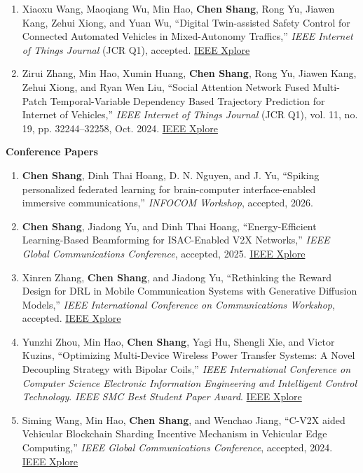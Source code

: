 \documentclass[10pt,a4paper]{article}
\newcommand{\pubitem}[1]{
  \item #1
}
\begin{document}
\begin{enumerate}[leftmargin=1.6em,itemsep=1pt,topsep=2pt]
  \pubitem{Xiaoxu Wang, Maoqiang Wu, Min Hao, \textbf{Chen Shang}, Rong Yu, Jiawen Kang, Zehui Xiong, and Yuan Wu, ``Digital Twin-assisted Safety Control for Connected Automated Vehicles in Mixed-Autonomy Traffics,'' \textit{IEEE Internet of Things Journal} (JCR Q1), accepted. \href{https://ieeexplore.ieee.org/document/10684822}{IEEE Xplore}}
  \pubitem{Zirui Zhang, Min Hao, Xumin Huang, \textbf{Chen Shang}, Rong Yu, Jiawen Kang, Zehui Xiong, and Ryan Wen Liu, ``Social Attention Network Fused Multi-Patch Temporal-Variable Dependency Based Trajectory Prediction for Internet of Vehicles,'' \textit{IEEE Internet of Things Journal} (JCR Q1), vol. 11, no. 19, pp. 32244--32258, Oct. 2024. \href{https://ieeexplore.ieee.org/document/10589564}{IEEE Xplore}}
\end{enumerate}

\textbf{Conference Papers}
\begin{enumerate}[leftmargin=1.6em,itemsep=1pt,topsep=2pt]
  \pubitem{\textbf{Chen Shang}, Dinh Thai Hoang, D. N. Nguyen, and J. Yu, ``Spiking personalized federated learning for brain-computer interface-enabled immersive communications,'' \textit{INFOCOM Workshop}, accepted, 2026.}
  \pubitem{\textbf{Chen Shang}, Jiadong Yu, and Dinh Thai Hoang, ``Energy-Efficient Learning-Based Beamforming for ISAC-Enabled V2X Networks,'' \textit{IEEE Global Communications Conference}, accepted, 2025. \href{https://ieeexplore.ieee.org/document/11431955}{IEEE Xplore}}
  \pubitem{Xinren Zhang, \textbf{Chen Shang}, and Jiadong Yu, ``Rethinking the Reward Design for DRL in Mobile Communication Systems with Generative Diffusion Models,'' \textit{IEEE International Conference on Communications Workshop}, accepted. \href{https://ieeexplore.ieee.org/document/11162180}{IEEE Xplore}}
  \pubitem{Yunzhi Zhou, Min Hao, \textbf{Chen Shang}, Yagi Hu, Shengli Xie, and Victor Kuzins, ``Optimizing Multi-Device Wireless Power Transfer Systems: A Novel Decoupling Strategy with Bipolar Coils,'' \textit{IEEE International Conference on Computer Science Electronic Information Engineering and Intelligent Control Technology}. \textit{IEEE SMC Best Student Paper Award}. \href{https://ieeexplore.ieee.org/document/10871425}{IEEE Xplore}}
  \pubitem{Siming Wang, Min Hao, \textbf{Chen Shang}, and Wenchao Jiang, ``C-V2X aided Vehicular Blockchain Sharding Incentive Mechanism in Vehicular Edge Computing,'' \textit{IEEE Global Communications Conference}, accepted, 2024. \href{https://ieeexplore.ieee.org/document/10901669}{IEEE Xplore}}
\end{enumerate}
\end{document}
